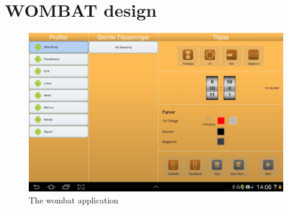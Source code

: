 \chapter{WOMBAT design}
\begin{figure}[H]
\centering
\includegraphics[angle=90,width=0.7215\linewidth]{img/screenshots/wombat.jpg}
\caption{The wombat application}
\label{fig:wombat}
\end{figure}

